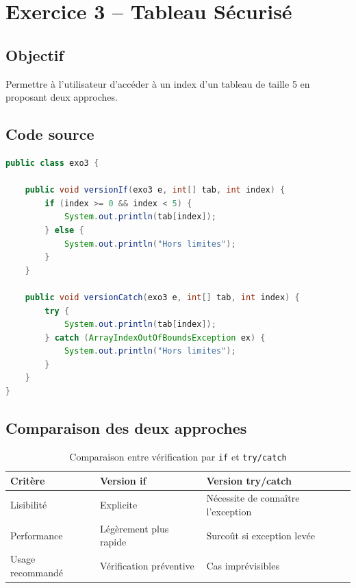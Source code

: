 \section{Exercice 3 -- Tableau Sécurisé}

\subsection{Objectif}

Permettre à l'utilisateur d'accéder à un index d'un tableau de taille 5
en proposant deux approches.

\subsection{Code source}

\begin{lstlisting}[language=Java, caption={exo3.java -- Accès sécurisé au tableau}]
public class exo3 {

    public void versionIf(exo3 e, int[] tab, int index) {
        if (index >= 0 && index < 5) {
            System.out.println(tab[index]);
        } else {
            System.out.println("Hors limites");
        }
    }

    public void versionCatch(exo3 e, int[] tab, int index) {
        try {
            System.out.println(tab[index]);
        } catch (ArrayIndexOutOfBoundsException ex) {
            System.out.println("Hors limites");
        }
    }
}
\end{lstlisting}

\subsection{Comparaison des deux approches}

\begin{table}[H]
\centering
\begin{tabularx}{0.85\textwidth}{C{3cm} X X}
\toprule
\textbf{\color{primarycolor}Critère} &
\textbf{\color{primarycolor}Version if} &
\textbf{\color{primarycolor}Version try/catch} \\
\midrule
Lisibilité & Explicite & Nécessite de connaître l'exception \\
\addlinespace[0.15cm]
Performance & Légèrement plus rapide & Surcoût si exception levée \\
\addlinespace[0.15cm]
Usage recommandé & Vérification préventive & Cas imprévisibles \\
\bottomrule
\end{tabularx}
\caption{Comparaison entre vérification par \texttt{if} et \texttt{try/catch}}
\end{table}

